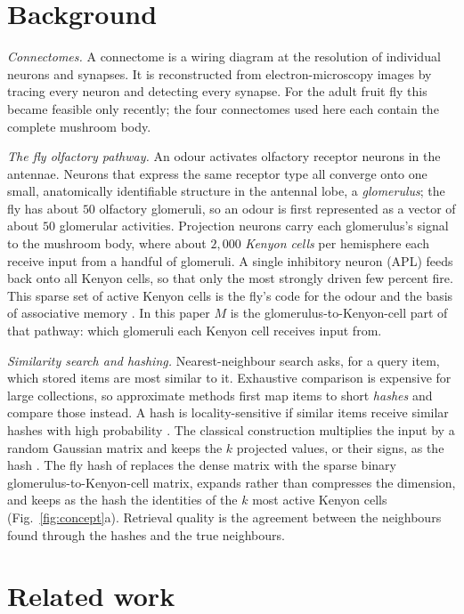 \documentclass[conference]{IEEEtran}
\begin{document}
\section{Background}
\label{sec:bg}

\emph{Connectomes.} A connectome is a wiring diagram at the resolution of
individual neurons and synapses. It is reconstructed from electron-microscopy images by tracing every neuron and detecting every synapse. For the adult fruit fly this became feasible only recently; the four connectomes used here each contain the complete mushroom body.

\emph{The fly olfactory pathway.} An odour activates olfactory receptor neurons
in the antennae. Neurons that express the same receptor type all converge onto
one small, anatomically identifiable structure in the antennal lobe, a
\emph{glomerulus}; the fly has about $50$ olfactory glomeruli, so an odour is
first represented as a vector of about $50$ glomerular activities. Projection
neurons carry each glomerulus's signal to the mushroom body, where about
$2{,}000$ \emph{Kenyon cells} per hemisphere each receive input from a handful
of glomeruli. A single inhibitory neuron (APL) feeds back onto all Kenyon cells,
so that only the most strongly driven few percent fire. This sparse set of active Kenyon cells is the fly's code for the odour and the basis of associative memory \cite{dasgupta2017,caron2013}. In this paper $M$ is
the glomerulus-to-Kenyon-cell part of that pathway: which glomeruli each
Kenyon cell receives input from.

\emph{Similarity search and hashing.} Nearest-neighbour search asks, for a
query item, which stored items are most similar to it. Exhaustive comparison
is expensive for large collections, so approximate methods first map items to
short \emph{hashes} and compare those instead. A hash is locality-sensitive
if similar items receive similar hashes with high probability
\cite{indyk1998}. The classical construction multiplies the input by a random
Gaussian matrix and keeps the $k$ projected values, or their signs, as the hash
\cite{charikar2002}. The fly hash of \cite{dasgupta2017} replaces the dense
matrix with the sparse binary glomerulus-to-Kenyon-cell matrix, expands rather
than compresses the dimension, and keeps as the hash the identities of the $k$
most active Kenyon cells (Fig.~\ref{fig:concept}a). Retrieval quality is the
agreement between the neighbours found through the hashes and the true
neighbours.

\section{Related work}
\end{document}
